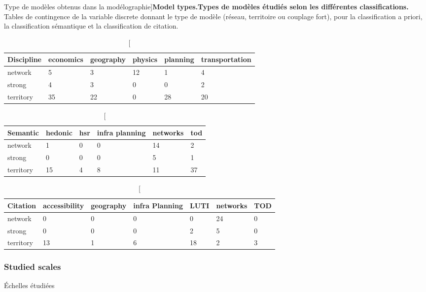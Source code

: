 \begin{table}
\caption[Model type][Type de modèles obtenus dans la modélographie]{\textbf{Model types.}\label{tab:modelography:what}}{\textbf{Types de modèles étudiés selon les différentes classifications.} Tables de contingence de la variable discrete donnant le type de modèle (réseau, territoire ou couplage fort), pour la classification a priori, la classification sémantique et la classification de citation.\label{tab:modelography:what}}
\begin{tabular}{|p{2.4cm}|p{2.4cm}p{2.4cm}p{2.4cm}p{2.4cm}p{2.4cm}|}
\hline
Discipline  &  economics & geography & physics & planning & transportation\\\hline
network     &     5      &      3    &   12    &    1     &         4  \\
strong      &     4      &     3     &   0     &   0      &        2  \\
territory   &    35      &    22     &   0     &    28    &         20 \\\hline  
\end{tabular} 
\medskip
\begin{tabular}{|p{2.4cm}|p{2.4cm}p{2.4cm}p{2.4cm}p{2.4cm}p{2.4cm}|}
\hline
Semantic  &  hedonic & hsr & infra planning & networks & tod\\\hline
network   &       1  & 0   &          0     &  14      & 2 \\
strong    &       0  &  0  &            0   &     5    & 1  \\
territory &      15  &  4  &            8   &    11    &  37 \\ \hline
\end{tabular}
\begin{tabular}{|p{2cm}|p{2cm}p{2cm}p{2cm}p{2cm}p{2cm}p{2cm}|}
\hline
Citation  &  accessibility & geography & infra Planning & LUTI & networks & TOD \\\hline
network   &            0   &     0     &         0      &   0  &     24   &  0 \\
strong    &            0   &      0    &          0     &   2  &      5   &  0 \\
territory &           13   &      1    &          6     &  18  &      2   &  3 \\\hline
\end{tabular}
\end{table}



\subsubsection{Studied scales}{Échelles étudiées}

